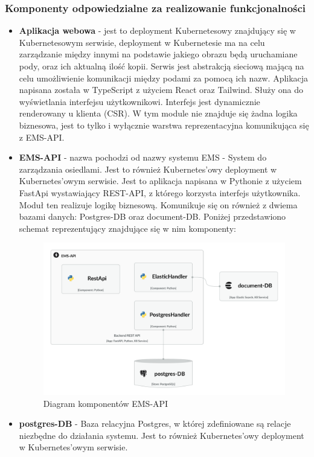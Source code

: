 \subsubsection{Komponenty odpowiedzialne za realizowanie funkcjonalności}
\begin{itemize}
    \item \textbf{Aplikacja webowa} - jest to deployment Kubernetesowy znajdujący się w Kubernetesowym serwisie, deployment w Kubernetesie ma na celu zarządzanie między innymi na podstawie jakiego obrazu będą uruchamiane pody, oraz ich aktualną ilość kopii. Serwis jest abstrakcją sieciową mającą na celu umożliwienie komunikacji między podami za pomocą ich nazw. Aplikacja napisana została w TypeScript z użyciem React oraz Tailwind. Służy ona do wyświetlania interfejsu użytkownikowi. Interfejs jest dynamicznie renderowany u klienta (CSR). W tym module nie znajduje się żadna logika biznesowa, jest to tylko i wyłącznie warstwa reprezentacyjna komunikująca się z EMS-API.
    \item \textbf{EMS-API} - nazwa pochodzi od nazwy systemu EMS - System do zarządzania osiedlami. Jest to również Kubernetes'owy deployment w Kubernetes'owym serwisie. Jest to aplikacja napisana w Pythonie z użyciem FastApi wystawiający REST-API, z którego korzysta interfejs użytkownika. Moduł ten realizuje logikę biznesową. Komunikuje się on również z dwiema bazami danych: Postgres-DB oraz document-DB. Poniżej przedstawiono schemat reprezentujący znajdujące się w nim komponenty:
    \begin{figure}[H]
        \centering
        \includegraphics[width=0.75\linewidth]{img/EMS-API Component Diagram (Current).png}
        \caption{Diagram komponentów EMS-API}
        \label{fig:ems-api-components}
    \end{figure}
    \item \textbf{postgres-DB} - Baza relacyjna Postgres, w której zdefiniowane są relacje niezbędne do działania systemu. Jest to również Kubernetes'owy deployment w Kubernetes'owym serwisie.

\end{itemize}
